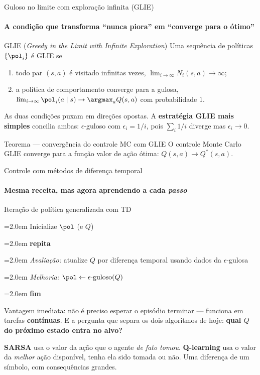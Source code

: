 \documentclass[aspectratio=169, 11pt]{beamer}
\newcommand{\Qstar}{Q^{*}}
\newcounter{plin}
\newcommand{\pl}[2][0em]{%
  \stepcounter{plin}%
  \par\noindent
  \hangindent=2.0em \hangafter=1
  \makebox[1.5em][r]{\color{rlCinza}\scriptsize\theplin:}\hspace{0.4em}\hspace*{#1}\ignorespaces#2\par}
\newenvironment{pseudo}%
  {\par\setcounter{plin}{0}\footnotesize\setlength{\parskip}{0.25ex}}%
  {\par}
\begin{document}
\begin{frame}{Guloso no limite com exploração infinita (GLIE)}
  \framesubtitle{A condição que transforma ``nunca piora'' em ``converge para o ótimo''}

  \begin{defbox}{GLIE (\emph{Greedy in the Limit with Infinite Exploration})}
    Uma sequência de políticas $\{\pol_i\}$ é GLIE se
    \begin{enumerate}\setlength{\itemsep}{0.3ex}
      \item todo par $(s,a)$ é visitado infinitas vezes,
        $\lim_{i \to \infty} N_i(s,a) \to \infty$;
      \item a política de comportamento converge para a gulosa,
        $\lim_{i \to \infty} \pol_i(a \mid s) \to \argmax_{a} Q(s,a)$ com
        probabilidade $1$.
    \end{enumerate}
  \end{defbox}

  {\small As duas condições puxam em direções opostas. A
  \textbf{estratégia GLIE mais simples} concilia ambas: $\epsilon$-guloso
  com $\epsilon_i = 1/i$, pois $\sum_i 1/i$ diverge mas $\epsilon_i \to 0$.}

  \begin{teobox}{Teorema — convergência do controle MC com GLIE}
    O controle Monte Carlo GLIE converge para a função valor de ação ótima:
    $Q(s,a) \to \Qstar(s,a)$.
  \end{teobox}
\end{frame}

\begin{frame}{Controle com métodos de diferença temporal}
  \framesubtitle{Mesma receita, mas agora aprendendo a cada \emph{passo}}

  \begin{algbox}{Iteração de política generalizada com TD}
    \begin{pseudo}
      \pl{Inicialize $\pol$ (e $Q$)}
      \pl{\textbf{repita}}
      \pl[1.2em]{\emph{Avaliação:} atualize $Q$ por diferença temporal usando dados da $\epsilon$-gulosa}
      \pl[1.2em]{\emph{Melhoria:} $\pol \leftarrow \epsilon\text{-guloso}(Q)$}
      \pl{\textbf{fim}}
    \end{pseudo}
  \end{algbox}

  {\small Vantagem imediata: não é preciso esperar o episódio terminar ---
  funciona em tarefas \textbf{contínuas}. E a pergunta que separa os dois
  algoritmos de hoje: \textbf{qual $Q$ do próximo estado entra no alvo?}}

  \vspace{-0.4em}
  \begin{ideiabox}
    \textbf{SARSA} usa o valor da ação que o agente \emph{de fato tomou}.
    \textbf{Q-learning} usa o valor da \emph{melhor} ação disponível,
    tenha ela sido tomada ou não. Uma diferença de um símbolo, com
    consequências grandes.
  \end{ideiabox}
\end{frame}
\end{document}
